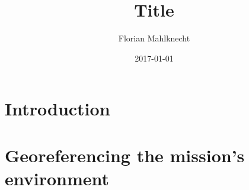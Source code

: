 \documentclass[a4paper,12pt, openright, twoside]{report}
\title{Title}
\author{Florian Mahlknecht}
\date{2017-01-01}
\providecommand{\keywords}[1]{\textbf{\textit{Keywords: }} #1}
\begin{document}
\hypersetup{pageanchor=false}
\maketitle


\thispagestyle{empty}
\setcounter{page}{2}
\cleardoublepage


\begin{abstract}
\thispagestyle{plain}
\setcounter{page}{3}
\lipsum[43]
\end{abstract}

\thispagestyle{empty}
\setcounter{page}{4}
\cleardoublepage

\begin{abstract}
\thispagestyle{plain}
\setcounter{page}{5}
\lipsum[44]
\end{abstract}



\hypersetup{pageanchor=true}
\thispagestyle{empty}
\cleardoublepage



\tableofcontents

\newpage


\renewcommand{\thechapter}{\Roman{chapter}}
\renewcommand*\thesection{\arabic{section}}

\chapter{Introduction} %
\label{cha:introduction}





\chapter{Georeferencing the mission's environment} %
\label{cha:georeferencing_the_mission_s_environment}





\newpage
\clearpage


\pagestyle{plain}





\listoffigures
\listoftables
\end{document}
